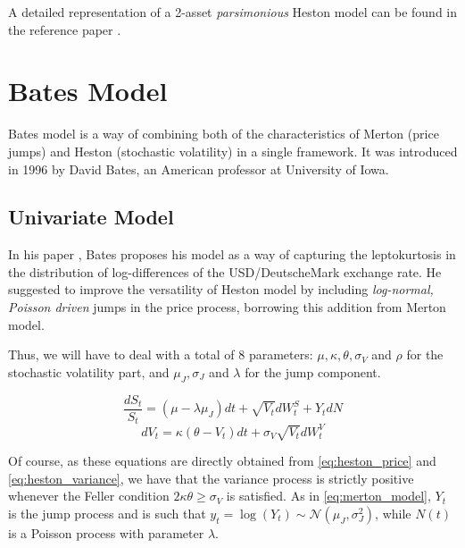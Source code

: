 A detailed representation of a 2-asset \textit{parsimonious} Heston model can be found in the reference paper \citep{PARSIMONIOUS2011}.

\bigskip
\section{Bates Model}
\label{sec:bates}
Bates model is a way of combining both of the characteristics of Merton (price jumps) and Heston (stochastic volatility) in a single framework.  It was introduced in 1996 by David Bates, an American professor at University of Iowa.

\subsection{Univariate Model}
In his paper \citep{BATES96}, Bates proposes his model as a way of capturing the leptokurtosis in the distribution of log-differences of the USD/DeutscheMark exchange rate. He suggested to improve the versatility of Heston model by including \textit{log-normal, Poisson driven} jumps in the price process, borrowing this addition from Merton model.

Thus, we will have to deal with a total of 8 parameters: $\mu, \kappa, \theta, \sigma_V$ and $ \rho$ for the stochastic volatility part, and $ \mu_J, \sigma_J$ and $ \lambda$ for the jump component. 


\begin{equation}
\frac{dS_t}{S_t} = (\mu - \lambda \mu_J) dt +\sqrt{ V_t} dW_t^S + Y_t dN 
\end{equation}
\begin{equation}
dV_t = \kappa (\theta - V_t) dt + \sigma_V \sqrt{V_t} dW_t^V
\end{equation}

Of course, as these equations are directly obtained from \eqref{eq:heston_price} and \eqref{eq:heston_variance}, we have that the variance process is strictly positive whenever the Feller condition $2\kappa\theta\geq \sigma_V$ is satisfied. As in \eqref{eq:merton_model}, $Y_t$ is  the jump process and is such that $ y_t = \log(Y_t) \sim \mathcal{N}(\mu_J, \sigma_J^2)$, while $N(t)$ is a Poisson process with parameter $\lambda$.



